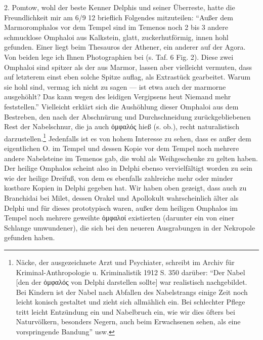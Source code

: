 \documentclass[a4paper, 11pt, oneside]{article}
\begin{document}
2. Pomtow, wohl der beste Kenner Delphis und seiner Überreste, hatte die Freundlichkeit mir am 6/9 12 brieflich Folgendes mitzuteilen: "`Außer dem Marmoromphalos vor dem Tempel sind im Temenos noch 2 bis 3 andere schmucklose Omphaloi aus Kalkstein, glatt, zuckerhutförmig, innen hohl gefunden. Einer liegt beim Thesauros der Athener, ein anderer auf der Agora. Von beiden lege ich Ihnen Photographien bei (s. Taf. 6 Fig. 2). Diese zwei Omphaloi sind spitzer als der aus Marmor, lassen aber vielleicht vermuten, dass auf letzterem einst eben solche Spitze auflag, als Extrastück gearbeitet. Warum sie hohl sind, vermag ich nicht zu sagen --- ist etwa auch der marmorne ausgehöhlt? Das kann wegen des leidigen Vergipsens heut Niemand mehr feststellen."' Vielleicht erklärt sich die Aushöhlung dieser Omphaloi aus dem Bestreben, den nach der Abschnürung und Durchschneidung zurückgebliebenen Rest der Nabelschnur, die ja auch ὀμφαλός hieß (s. ob.), recht naturalistisch darzustellen.\footnote{Näcke, der ausgezeichnete Arzt und Psychiater, schreibt im Archiv für Kriminal-Anthropologie u. Kriminalistik 1912 S. 350 darüber: "`Der Nabel [den der ὀμφαλός von Delphi darstellen sollte] war realistisch nachgebildet. Bei Kindern ist der Nabel nach Abfallen des Nabelstrangs einige Zeit noch leicht konisch gestaltet und zieht sich allmählich ein. Bei schlechter Pflege tritt leicht Entzündung ein und Nabelbruch ein, wie wir dies öfters bei Naturvölkern, besonders Negern, auch beim Erwachsenen sehen, als eine vorspringende Bandung"' usw.} Jedenfalls ist es von hohem Interesse zu sehen, dass es außer dem eigentlichen O. im Tempel und dessen Kopie vor dem Tempel noch mehrere andere Nabelsteine im Temenos gab, die wohl als Weihgeschenke zu gelten haben. Der heilige Omphalos scheint also in Delphi ebenso vervielfältigt worden zu sein wie der heilige Dreifuß, von dem es ebenfalls zahlreiche mehr oder minder kostbare Kopien in Delphi gegeben hat. Wir haben oben gezeigt, dass auch zu Branchidai bei Milet, dessen Orakel und Apollokult wahrscheinlich älter als Delphi und für dieses prototypisch waren, außer dem heiligen Omphalos im Tempel noch mehrere geweihte ὀμφαλοί existierten (darunter ein von einer Schlange umwundener), die sich bei den neueren Ausgrabungen in der Nekropole gefunden haben.
\end{document}
